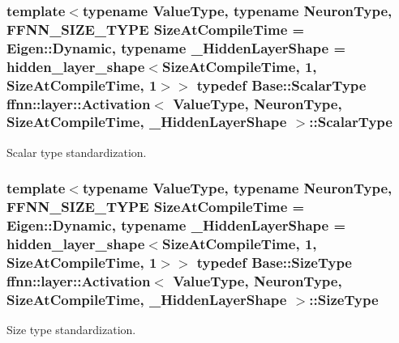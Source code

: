 \hypertarget{classffnn_1_1layer_1_1_activation_a4ca1ce43c5be7e5b8950af7cb262daca}{
\subsubsection[{Scalar\-Type}]{\setlength{\rightskip}{0pt plus 5cm}template$<$typename Value\-Type, typename Neuron\-Type, F\-F\-N\-N\-\_\-\-S\-I\-Z\-E\-\_\-\-T\-Y\-P\-E Size\-At\-Compile\-Time = Eigen\-::\-Dynamic, typename \-\_\-\-Hidden\-Layer\-Shape = hidden\-\_\-layer\-\_\-shape$<$\-Size\-At\-Compile\-Time, 1, Size\-At\-Compile\-Time, 1$>$$>$ typedef {\bf Base\-::\-Scalar\-Type} {\bf ffnn\-::layer\-::\-Activation}$<$ Value\-Type, Neuron\-Type, Size\-At\-Compile\-Time, \-\_\-\-Hidden\-Layer\-Shape $>$\-::{\bf Scalar\-Type}}}\label{classffnn_1_1layer_1_1_activation_a4ca1ce43c5be7e5b8950af7cb262daca}


Scalar type standardization. 

\hypertarget{classffnn_1_1layer_1_1_activation_a6a7b6dd86eb70b72a179ce9951fb1149}{
\subsubsection[{Size\-Type}]{\setlength{\rightskip}{0pt plus 5cm}template$<$typename Value\-Type, typename Neuron\-Type, F\-F\-N\-N\-\_\-\-S\-I\-Z\-E\-\_\-\-T\-Y\-P\-E Size\-At\-Compile\-Time = Eigen\-::\-Dynamic, typename \-\_\-\-Hidden\-Layer\-Shape = hidden\-\_\-layer\-\_\-shape$<$\-Size\-At\-Compile\-Time, 1, Size\-At\-Compile\-Time, 1$>$$>$ typedef {\bf Base\-::\-Size\-Type} {\bf ffnn\-::layer\-::\-Activation}$<$ Value\-Type, Neuron\-Type, Size\-At\-Compile\-Time, \-\_\-\-Hidden\-Layer\-Shape $>$\-::{\bf Size\-Type}}}\label{classffnn_1_1layer_1_1_activation_a6a7b6dd86eb70b72a179ce9951fb1149}


Size type standardization. 



